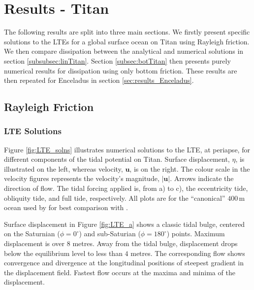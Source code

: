 \section{Results - Titan \label{sec:results_Titan}}

The following results are split into three main sections. We firstly present specific solutions to the LTEs for a global surface ocean on Titan using Rayleigh friction. We then compare dissipation between the analytical and numerical solutions in section \ref{subsubsec:linTitan}. Section \ref{subsec:botTitan} then presents purely numerical results for dissipation using only bottom friction. These results are then repeated for Enceladus in section \ref{sec:results_Enceladus}.

\subsection{Rayleigh Friction}

\subsubsection{LTE Solutions}

Figure \ref{fig:LTE_solns} illustrates numerical solutions to the LTE, at periapse, for different components of the tidal potential on Titan. Surface displacement, $\eta$, is illustrated on the left, whereas velocity, $\bm{u}$, is on the right. The colour scale in the velocity figures represents the velocity's magnitude, $\left| \bm{u} \right|$. Arrows indicate the direction of flow. The tidal forcing applied is, from a) to c), the eccentricity tide, obliquity tide, and full tide, respectively. All plots are for the ``canonical'' $400 \, \si{\metre}$ ocean used by \citet{sagan1982tide} for best comparison with \citet{sears1994tidal,sears1995tidal,sohl1995tidal}.

Surface displacement in Figure \ref{fig:LTE_a} shows a classic tidal bulge, centered on the Saturnian ($\phi = 0^{\circ}$) and sub-Saturian ($\phi = 180^{\circ}$) points. Maximum displacement is over $8$ metres. Away from the tidal bulge, displacement drops below the equilibrium level to less than $4$ metres. The corresponding flow shows convergence and divergence at the longitudinal positions of steepest gradient in the displacement field. Fastest flow occurs at the maxima and minima of the displacement.

